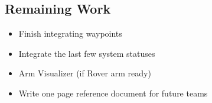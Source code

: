 \subsection{Remaining Work}
\begin{itemize}
\item Finish integrating waypoints
\item Integrate the last few system statuses
\item Arm Visualizer (if Rover arm ready)
\item Write one page reference document for future teams
\end{itemize}